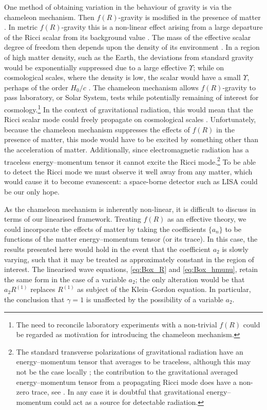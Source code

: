 One method of obtaining variation in the behaviour of gravity is via the chameleon mechanism. Then $f(R)$-gravity is modified in the presence of matter \citep{Khoury2004a, Khoury2004, Brax2004, Khoury2013}. In metric $f(R)$-gravity this is a non-linear effect arising from a large departure of the Ricci scalar from its background value \citep{DeFelice2010}. The mass of the effective scalar degree of freedom then depends upon the density of its environment \citep{Faulkner2007, Li2007}. In a region of high matter density, such as the Earth, the deviations from standard gravity would be exponentially suppressed due to a large effective $\Upsilon$; while on cosmological scales, where the density is low, the scalar would have a small $\Upsilon$, perhaps of the order $H_0/c$ \citep{Khoury2004a, Khoury2004}. The chameleon mechanism allows $f(R)$-gravity to pass laboratory, or Solar System, tests while potentially remaining of interest for cosmology.\footnote{The need to reconcile laboratory experiments with a non-trivial $f(R)$ could be regarded as motivation for introducing the chameleon mechanism.} In the context of gravitational radiation, this would mean that the Ricci scalar mode could freely propagate on cosmological scales \citep{Corda2009}. Unfortunately, because the chameleon mechanism suppresses the effects of $f(R)$ in the presence of matter, this mode would have to be excited by something other than the acceleration of matter. Additionally, since electromagnetic radiation has a traceless energy--momentum tensor it cannot excite the Ricci mode.\footnote{The standard transverse polarizations of gravitational radiation have an energy--momentum tensor that averages to be traceless, although this may not be the case locally \citep{Butcher2010}; the contribution to the gravitational averaged energy--momentum tensor from a propagating Ricci mode does have a non-zero trace, see . In any case it is doubtful that gravitational energy--momentum could act as a source for detectable radiation.} To be able to detect the Ricci mode we must observe it well away from any matter, which would cause it to become evanescent: a space-borne detector such as LISA could be our only hope.

As the chameleon mechanism is inherently non-linear, it is difficult to discuss in terms of our linearised framework. Treating $f(R)$ as an effective theory, we could incorporate the effects of matter by taking the coefficients $\{a_n\}$ to be functions of the matter energy--momentum tensor (or its trace). In this case, the results presented here would hold in the event that the coefficient $a_2$ is slowly varying, such that it may be treated as approximately constant in the region of interest. The linearised wave equations, \eqref{eq:Box_R} and \eqref{eq:Box_hmunu}, retain the same form in the case of a variable $a_2$; the only alteration would be that $a_2 R^{(1)}$ replaces $R^{(1)}$ as subject of the Klein--Gordon equation. In particular, the conclusion that $\gamma = 1$ is unaffected by the possibility of a variable $a_2$.